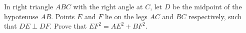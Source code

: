 In right triangle $ABC$ with the right angle at $C$, let $D$ be the midpoint of the hypotenuse $AB$. Points $E$ and $F$ lie on the legs $AC$ and $BC$ respectively, such that $DE\perp DF$. Prove that $EF^2=AE^2+BF^2$.
